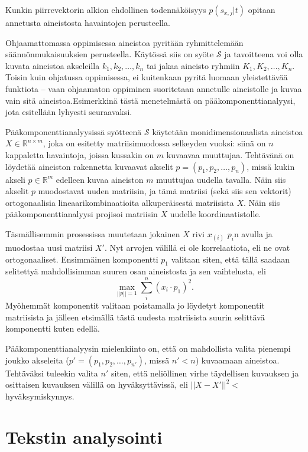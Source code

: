 \documentclass[finnish,gradu,twoside,12pt]{tktltiki}
\begin{document}
{Kunkin piirrevektorin alkion ehdollinen todennäköisyys $p( s_{x,j} | t)$ opitaan annetusta aineistosta havaintojen perusteella.

Ohjaamattomassa oppimisessa aineistoa pyritään ryhmittelemään säännönmukaisuuksien perusteella. Käytössä siis on syöte $\mathcal{S}$ ja tavoitteena voi olla kuvata aineistoa akseleilla $k_1, k_2, \ldots , k_n$ tai jakaa aineisto ryhmiin $K_1, K_2, \ldots, K_n$. Toisin kuin ohjatussa oppimisessa, ei kuitenkaan pyritä luomaan yleistettävää funktiota -- vaan ohjaamaton oppiminen suoritetaan annetulle aineistolle ja kuvaa vain sitä aineistoa.Esimerkkinä tästä menetelmästä on pääkomponenttianalyysi, jota esitellään lyhyesti seuraavaksi.

Pääkomponenttianalyysissä syötteenä $\mathcal{S}$ käytetään monidimensionaalista aineistoa $X \in \mathbb{R}^{ n \times m}$, joka on esitetty matriisimuodossa selkeyden vuoksi: siinä on $n$ kappaletta havaintoja, joissa kussakin on $m$ kuvaavaa muuttujaa. Tehtävänä on löydetää aineiston rakennetta kuvaavat akselit $p = ( p_1, p_2, \ldots, p_n )$, missä kukin akseli $p \in \mathbb{R}^m$ edelleen kuvaa aineiston $m$  muuttujaa uudella tavalla. Näin siis akselit $p$ muodostavat uuden matriisin, ja tämä matriisi (sekä siis sen vektorit) ortogonaalisia lineaarikombinaatioita alkuperäisestä matriisista $X$. Näin siis pääkomponenttianalyysi projisoi matriisin $X$ uudelle koordinaatistolle.

Täsmällisemmin prosessissa muutetaan jokainen $X$ rivi $x_{(i)}$ $p_i$n avulla ja muodostaa uusi matriisi $X'$. Nyt arvojen välillä ei ole korrelaatiota, eli ne ovat ortogonaaliset. Ensimmäinen komponentti $p_1$ valitaan siten, että tällä saadaan selitettyä mahdollisimman suuren osan aineistosta ja sen vaihtelusta, eli $$\max_{||p||=1} \sum_i^n (x_i \cdot p_1 )^2.$$ Myöhemmät komponentit valitaan poistamalla jo löydetyt komponentit matriisista ja jälleen etsimällä tästä uudesta matriisista suurin selittävä  komponentti kuten edellä.

Pääkomponenttianalyysin mielenkiinto on, että on mahdollista valita pienempi joukko akseleita ($p' = (p_1, p_2, \ldots, p_{n'})$, missä $n' < n$) kuvaamaan aineistoa. Tehtäväksi tuleekin valita $n'$ siten, että neliöllinen virhe täydellisen kuvauksen ja osittaisen kuvauksen välillä on hyväksyttävissä, eli $||X-X'||^2 < $ hyväksymiskynnys.

\section{Tekstin analysointi}
\label{sec:textanalysis}

}
\end{document}
